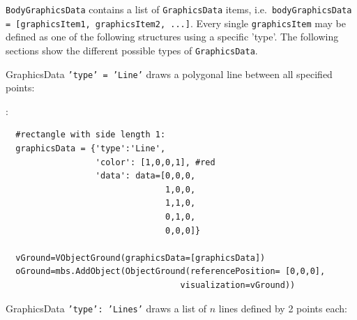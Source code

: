 \texttt{BodyGraphicsData} contains a list of \texttt{GraphicsData} items, i.e.\ \texttt{bodyGraphicsData = [graphicsItem1, graphicsItem2, ...]}. Every single \texttt{graphicsItem} may be defined as one of the following structures using a specific 'type'.
The following sections show the different possible types of \texttt{GraphicsData}.


GraphicsData \texttt{'type' = 'Line'} draws a polygonal line between all specified points:
\finishTable

\noindent {}:
\pythonstyle\begin{lstlisting}
  #rectangle with side length 1:
  graphicsData = {'type':'Line', 
                  'color': [1,0,0,1], #red
                  'data': data=[0,0,0, 
                                1,0,0, 
                                1,1,0, 
                                0,1,0, 
                                0,0,0]} 

  vGround=VObjectGround(graphicsData=[graphicsData])
  oGround=mbs.AddObject(ObjectGround(referencePosition= [0,0,0], 
                                   visualization=vGround))
\end{lstlisting}

%
GraphicsData \texttt{'type': 'Lines'} draws a list of $n$ lines defined by 2 points each:
\finishTable


